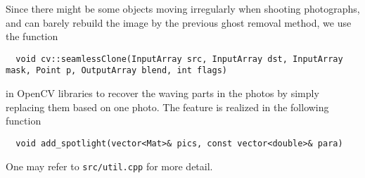 Since there might be some objects moving irregularly when shooting photographs, and can barely rebuild the image by the previous ghost removal method, we use the function
\begin{lstlisting}
  void cv::seamlessClone(InputArray src, InputArray dst, InputArray mask, Point p, OutputArray blend, int flags)
\end{lstlisting}
in OpenCV libraries to recover the waving parts in the photos by simply replacing them based on one photo. The feature is realized in the following function
\begin{lstlisting}
  void add_spotlight(vector<Mat>& pics, const vector<double>& para)
\end{lstlisting}
One may refer to \texttt{src/util.cpp} for more detail.